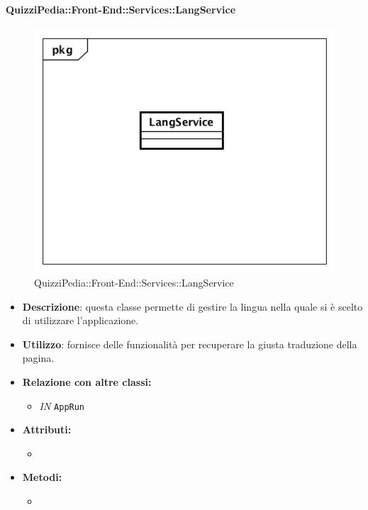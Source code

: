 \paragraph{QuizziPedia::Front-End::Services::LangService}
\begin{figure}
	\centering
	\includegraphics[scale=0.45]{UML/Classi/Front-End/QuizziPedia_Front-end_Services_ LangService.png}
	\caption{QuizziPedia::Front-End::Services::LangService}
\end{figure}
\begin{itemize}
	\item \textbf{Descrizione}: questa classe permette di gestire la lingua nella quale si è scelto di utilizzare l'applicazione.
	\item \textbf{Utilizzo}: fornisce delle funzionalità per recuperare la giusta traduzione della pagina.
	\item \textbf{Relazione con altre classi:}
	\begin{itemize}
		\item \textit{IN} \texttt{AppRun}
		
	\end{itemize}
	\item \textbf{Attributi:}
	\begin{itemize}
		\item 
	\end{itemize}
	\item \textbf{Metodi:}
	\begin{itemize}
		\item 
	\end{itemize}
\end{itemize}

